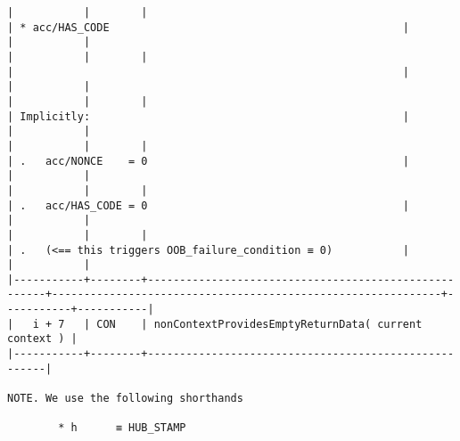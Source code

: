\documentclass[varwidth=\maxdimen,margin=0.5cm,multi={verbatim}]{standalone}
\begin{document}
\begin{verbatim}
|           |        |                                                      | * acc/HAS_CODE                                              |           |           |
|           |        |                                                      |                                                             |           |           |
|           |        |                                                      | Implicitly:                                                 |           |           |
|           |        |                                                      | .   acc/NONCE    = 0                                        |           |           |
|           |        |                                                      | .   acc/HAS_CODE = 0                                        |           |           |
|           |        |                                                      | .   (<== this triggers OOB_failure_condition ≡ 0)           |           |           |
|-----------+--------+------------------------------------------------------+-------------------------------------------------------------+-----------+-----------|
|   i + 7   | CON    | nonContextProvidesEmptyReturnData( current context ) |
|-----------+--------+------------------------------------------------------|

NOTE. We use the following shorthands

        * h      ≡ HUB_STAMP

\end{verbatim}
\end{document}
